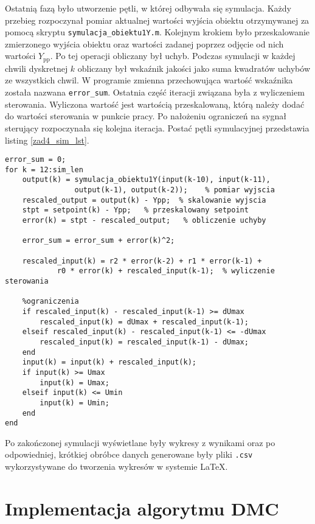 Ostatnią fazą było utworzenie pętli, w której odbywała się symulacja. Każdy przebieg rozpoczynał pomiar aktualnej wartości wyjścia obiektu otrzymywanej za pomocą skryptu \verb+symulacja_obiektu1Y.m+. Kolejnym krokiem było przeskalowanie zmierzonego wyjścia obiektu oraz wartości zadanej poprzez odjęcie od nich wartości $Y_{\mathrm{pp}}$. Po tej operacji obliczany był uchyb. Podczas symulacji w każdej chwili dyskretnej $k$ obliczany był wskaźnik jakości jako suma kwadratów uchybów ze wszystkich chwil. W programie zmienna przechowująca wartość wskaźnika została nazwana \verb+error_sum+. Ostatnia część iteracji związana była z wyliczeniem sterowania. Wyliczona wartość jest wartością przeskalowaną, którą należy dodać do wartości sterowania w punkcie pracy. Po nałożeniu ograniczeń na sygnał sterujący rozpoczynała się kolejna iteracja. Postać pętli symulacyjnej przedstawia listing \ref{zad4_sim_lst}.\\ 
\begin{lstlisting}[style=custommatlab,frame=single,label={zad4_sim_lst},caption={Petla symulujaca dzialanie cyfrowego algorytmu PID},captionpos=b]
error_sum = 0;
for k = 12:sim_len     
    output(k) = symulacja_obiektu1Y(input(k-10), input(k-11),
    			output(k-1), output(k-2));    % pomiar wyjscia
    rescaled_output = output(k) - Ypp;  % skalowanie wyjscia   
    stpt = setpoint(k) - Ypp;   % przeskalowany setpoint
    error(k) = stpt - rescaled_output;   % obliczenie uchyby   
    
    error_sum = error_sum + error(k)^2;
    
    rescaled_input(k) = r2 * error(k-2) + r1 * error(k-1) +
    		r0 * error(k) + rescaled_input(k-1);  % wyliczenie sterowania 
  
    %ograniczenia  
    if rescaled_input(k) - rescaled_input(k-1) >= dUmax
        rescaled_input(k) = dUmax + rescaled_input(k-1);
    elseif rescaled_input(k) - rescaled_input(k-1) <= -dUmax
        rescaled_input(k) = rescaled_input(k-1) - dUmax;
    end   
    input(k) = input(k) + rescaled_input(k);
    if input(k) >= Umax
        input(k) = Umax;
    elseif input(k) <= Umin
        input(k) = Umin;
    end 
end
\end{lstlisting}
Po zakończonej symulacji wyświetlane były wykresy z wynikami oraz po odpowiedniej, krótkiej obróbce danych generowane były pliki \verb+.csv+ wykorzystywane do tworzenia wykresów w systemie \LaTeX.


\section{Implementacja algorytmu DMC}
\label{zad4_dmc}

